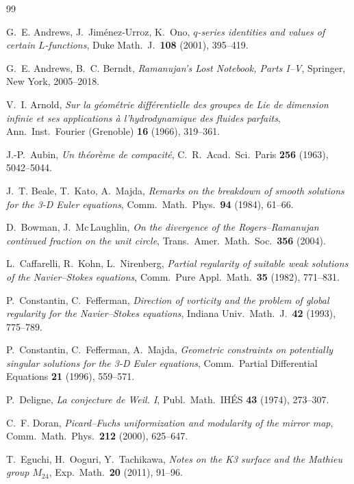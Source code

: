 \documentclass[11pt,a4paper]{article}
\theoremstyle{plain}
\theoremstyle{definition}
\theoremstyle{remark}
\begin{document}
\begin{thebibliography}{99}\small

G.~E. Andrews, J.~Jim\'enez-Urroz, K.~Ono,
\emph{$q$-series identities and values of certain $L$-functions},
Duke Math.\ J.\ \textbf{108} (2001), 395--419.

G.~E. Andrews, B.~C. Berndt,
\emph{Ramanujan's Lost Notebook, Parts I--V},
Springer, New York, 2005--2018.

V.~I. Arnold,
\emph{Sur la g\'eom\'etrie diff\'erentielle des groupes de Lie de dimension infinie et ses applications \`a l'hydrodynamique des fluides parfaits},
Ann.\ Inst.\ Fourier (Grenoble) \textbf{16} (1966), 319--361.

J.-P.~Aubin,
\emph{Un th\'eor\`eme de compacit\'e},
C.\ R.\ Acad.\ Sci.\ Paris \textbf{256} (1963), 5042--5044.

J.~T. Beale, T.~Kato, A.~Majda,
\emph{Remarks on the breakdown of smooth solutions for the 3-D Euler
equations}, Comm.\ Math.\ Phys.\ \textbf{94} (1984), 61--66.

D.~Bowman, J.~Mc\,Laughlin,
\emph{On the divergence of the Rogers--Ramanujan continued fraction on the
unit circle}, Trans.\ Amer.\ Math.\ Soc.\ \textbf{356} (2004).

L.~Caffarelli, R.~Kohn, L.~Nirenberg,
\emph{Partial regularity of suitable weak solutions of the Navier--Stokes
equations}, Comm.\ Pure Appl.\ Math.\ \textbf{35} (1982), 771--831.

P.~Constantin, C.~Fefferman,
\emph{Direction of vorticity and the problem of global regularity for the
Navier--Stokes equations}, Indiana Univ.\ Math.\ J.\ \textbf{42} (1993),
775--789.

P.~Constantin, C.~Fefferman, A.~Majda,
\emph{Geometric constraints on potentially singular solutions for the 3-D
Euler equations}, Comm.\ Partial Differential Equations \textbf{21} (1996),
559--571.

P.~Deligne,
\emph{La conjecture de Weil. I},
Publ.\ Math.\ IH\'ES \textbf{43} (1974), 273--307.

C.~F. Doran,
\emph{Picard--Fuchs uniformization and modularity of the mirror map},
Comm.\ Math.\ Phys.\ \textbf{212} (2000), 625--647.

T.~Eguchi, H.~Ooguri, Y.~Tachikawa,
\emph{Notes on the K3 surface and the Mathieu group $M_{24}$},
Exp.\ Math.\ \textbf{20} (2011), 91--96.


\end{thebibliography}
\end{document}
